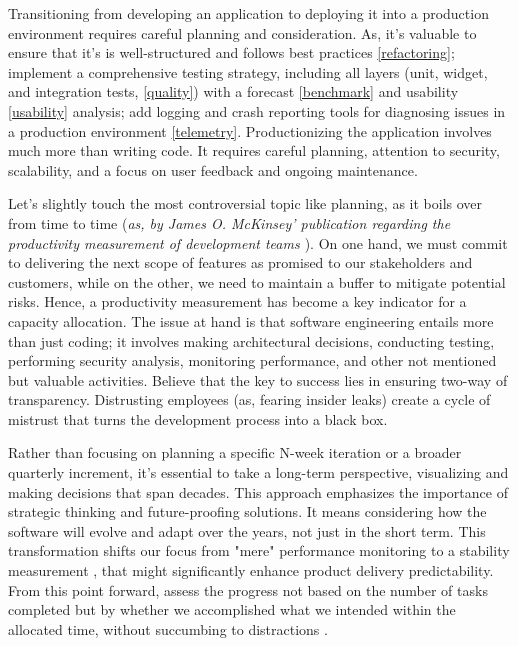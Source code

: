 

Transitioning from developing an application to deploying it into a production environment requires careful planning 
and consideration. As, it's valuable to ensure that it's is well-structured and follows best practices 
\ref{refactoring}; implement a comprehensive testing strategy, including all layers (unit, widget, and integration 
tests, \ref{quality}) with a forecast \ref{benchmark} and usability \ref{usability} analysis; add logging and crash 
reporting tools for diagnosing issues in a production environment \ref{telemetry}. Productionizing the application 
involves much more than writing code. It requires careful planning, attention to security, scalability, and a focus 
on user feedback and ongoing maintenance. 

Let's slightly touch the most controversial topic like planning, as it boils over from time to time (\emph{as, by James 
O. McKinsey' publication regarding the productivity measurement of development teams \cite{McKi23}}). On one hand, we 
must commit to delivering the next scope of features as promised to our stakeholders and customers, while on the other, 
we need to maintain a buffer to mitigate potential risks. Hence, a productivity measurement has become a key indicator 
for a capacity allocation. The issue at hand is that software engineering entails more than just coding; it involves 
making architectural decisions, conducting testing, performing security analysis, monitoring performance, and other 
not mentioned but valuable activities. Believe that the key to success lies in ensuring two-way of transparency. 
Distrusting employees (as, fearing insider leaks) create a cycle of mistrust that turns the development process into a 
black box. 

Rather than focusing on planning a specific N-week iteration or a broader quarterly increment, it's essential to take a 
long-term perspective, visualizing and making decisions that span decades. This approach emphasizes the importance of 
strategic thinking and future-proofing solutions. It means considering how the software will evolve and adapt over the 
years, not just in the short term. This transformation shifts our focus from "mere" performance monitoring to a 
stability measurement \cite{Heal23}, that might significantly enhance product delivery predictability.
From this point forward, assess the progress not based on the number of tasks completed but by whether we 
accomplished what we intended within the allocated time, without succumbing to distractions \cite{Eyal20}.

